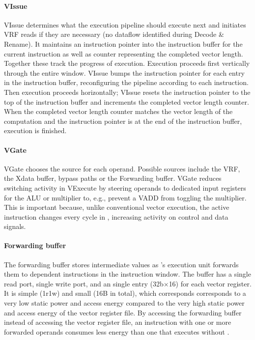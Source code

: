 \paragraph{VIssue}
VIssue determines what the execution pipeline should execute next and initiates VRF reads if they are necessary (no dataflow identified during Decode \& Rename).
% 
It maintains an instruction pointer into the instruction buffer for the current instruction as well as counter representing the completed vector length.
% 
Together these track the progress of execution.
% 
Execution proceeds first vertically through the entire window.
% 
VIssue bumps the instruction pointer for each entry in the instruction buffer, reconfiguring the pipeline according to each instruction.
% 
Then execution proceeds horizontally; VIssue resets the instruction pointer to the top of the instruction buffer and increments the completed vector length counter.
% 
When the completed vector length counter matches the vector length of the computation and the instruction pointer is at the end of the instruction buffer, execution is finished.

\paragraph{VGate}
VGate chooses the source for each operand.
% 
Possible sources include the VRF, the Xdata buffer, bypass paths or the Forwarding buffer.
% 
VGate reduces switching activity in VExecute by steering operands to dedicated input registers for the ALU or multiplier to, e.g., prevent a VADD from toggling the multiplier.
%
This is important because, unlike conventional vector execution, the active instruction changes every cycle in \manic, increasing activity on control and data signals.

\paragraph{Forwarding buffer} 
The forwarding buffer stores intermediate values as \manic's execution unit forwards them to
dependent instructions in the instruction window. 
%
The buffer has a single read port, single write port, and an single entry (32b$\times$16) for each vector register.
%
It is simple (1r1w) and small (16B in total), which corresponds
corresponds to a very low static power and access energy compared to the very 
high static power and access energy of the vector register file.
%
By accessing the forwarding buffer instead of accessing the vector register
file, an instruction with one or more forwarded operands consumes less energy
than one that executes without \manic. 

